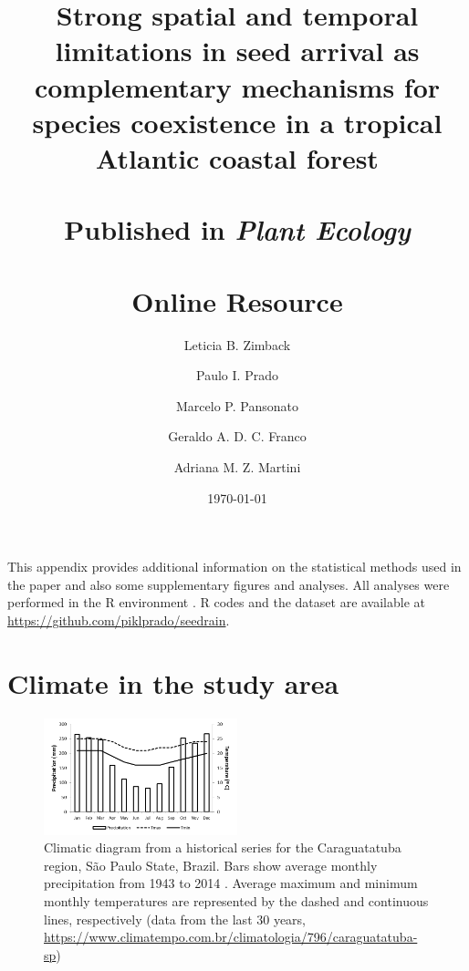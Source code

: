 \documentclass[A4]{article}
\begin{document}
\captionsetup{
    labelfont = bf,
    textfont  = it
  }


\title{Strong spatial and temporal limitations in seed arrival as
  complementary mechanisms for species coexistence in a tropical
  Atlantic coastal forest \\ \ \\
  Published in \emph{Plant Ecology} \\ \ \\
  \textbf{Online Resource}} 

\author[1,2]{Leticia B. Zimback}
\author[2]{Paulo I. Prado}
\author[2]{Marcelo P. Pansonato}
\author[3]{Geraldo A. D. C. Franco}
\author[2,4]{Adriana M. Z. Martini}



\date{\today}

\maketitle

This appendix provides additional information on the statistical
methods used in the paper and also some supplementary figures and
analyses. All analyses were performed in the R environment
\cite{Rcore}.  R codes and the dataset are available at
\url{https://github.com/piklprado/seedrain}.


\section*{Climate in the study area}

\begin{figure}[!htb]
  \centering
  \includegraphics[width=0.5\textwidth]{../figures/climate_diagram}
  \caption{Climatic diagram from a historical series for the
    Caraguatatuba region, São Paulo State, Brazil. Bars show average
    monthly precipitation from 1943 to 2014 \cite{Santos2019}. Average
    maximum and minimum monthly temperatures are represented by the
    dashed and continuous lines, respectively (data from the last 30
    years, \protect\url{https://www.climatempo.com.br/climatologia/796/caraguatatuba-sp})}
  \label{fig:climate_diag}
\end{figure}
\end{document}
